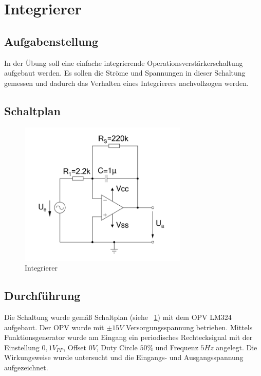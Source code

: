 \documentclass[12pt,a4paper,titlepage]{article}
\begin{document}
\section{Integrierer}


\subsection*{Aufgabenstellung}
In der \"Ubung soll eine einfache integrierende Operationsverstärkerschaltung aufgebaut werden. Es sollen die Str\"ome und Spannungen in dieser Schaltung gemessen und dadurch das Verhalten eines Integrierers nachvollzogen werden.

\subsection*{Schaltplan}
\begin{figure}[H]
  \centering
  \includegraphics[width=80mm]{integrierer_opv_schaltung.png}
  \caption{Integrierer}
  \label{figure31}
\end{figure}

\subsection*{Durchf\"uhrung}
Die Schaltung wurde gemäß Schaltplan (siehe ~\ref{figure31}) mit dem OPV LM324 aufgebaut. Der OPV wurde mit $\pm 15V$ Versorgungsspannung betrieben. Mittels Funktionsgenerator wurde am Eingang ein periodisches Rechtecksignal mit der Einstellung $0,1 V_{PP}$, Offset $0V$, Duty Circle $50\%$ und Frequenz $5Hz$ angelegt. Die Wirkungsweise wurde untersucht und die Eingangs- und Ausgangsspannung aufgezeichnet.
\end{document}
